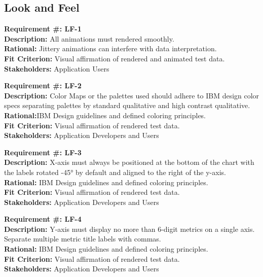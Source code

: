 \documentclass[12pt, titlepage]{article}
\begin{document}
\subsection{Look and Feel}
\begin{flushleft}
\textbf{Requirement \#: LF-1} \\
\textbf{Description:} All animations must rendered smoothly. \\
\textbf{Rational:} Jittery animations can interfere with data interpretation. \\
\textbf{Fit Criterion:} Visual affirmation of rendered and animated test data.
\textbf{Stakeholders:} Application Users \\
\end{flushleft}
\begin{flushleft}
\textbf{Requirement \#: LF-2} \\
\textbf{Description:} Color Maps or the palettes used should adhere to IBM design color specs separating palettes by standard qualitative and high contrast qualitative. \\
\textbf{Rational:}IBM Design guidelines and defined coloring principles. \\
\textbf{Fit Criterion:} Visual affirmation of rendered test data.  \\
\textbf{Stakeholders:} Application Developers and Users \\
\end{flushleft}
\begin{flushleft}
\textbf{Requirement \#: LF-3} \\
\textbf{Description:} X-axis must always be positioned at the bottom of the chart with the labels rotated -\ang{45} by default and aligned to the right of the y-axis. \\ 
\textbf{Rational:} IBM Design guidelines and defined coloring principles.\\
\textbf{Fit Criterion:} Visual affirmation of rendered test data. \\
\textbf{Stakeholders:} Application Developers and Users \\
\end{flushleft}
\begin{flushleft}
\textbf{Requirement \#: LF-4} \\
\textbf{Description:} Y-axis must display no more than 6-digit metrics on a single axis. Separate multiple metric title labels with commas. \\ 
\textbf{Rational:} IBM Design guidelines and defined coloring principles. \\
\textbf{Fit Criterion:} Visual affirmation of rendered test data. \\
\textbf{Stakeholders:} Application Developers and Users \\
\end{flushleft}
\end{document}
